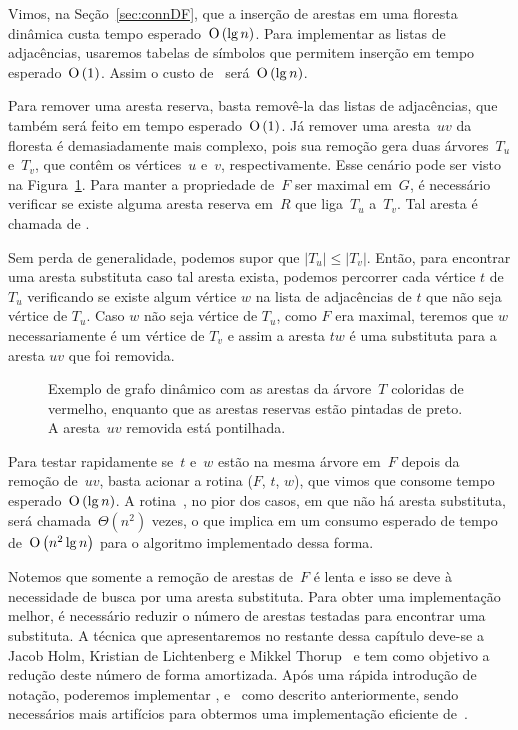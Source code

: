  Vimos, na Seção~\ref{sec:connDF}, que a inserção de arestas em uma floresta dinâmica custa tempo esperado~$\text{O}\left(\lg n\right)$. Para implementar as listas de adjacências, usaremos tabelas de símbolos que permitem inserção em tempo esperado~$\text{O}\left(1\right)$. Assim o custo de~\dymGraphAddEdge{} será~$\text{O}\left(\lg n\right)$.

Para remover uma aresta reserva, basta removê-la das listas de adjacências, que também será feito em tempo esperado~$\text{O}\left(1\right)$. Já remover uma aresta~$uv$ da floresta é demasiadamente mais complexo, pois sua remoção gera duas árvores~$T_u$ e~$T_v$, que contêm os vértices~$u$ e~$v$, respectivamente. Esse cenário pode ser visto na Figura~\ref{fig:DG-exemploTu-Tv}. Para manter a propriedade de~$F$ ser maximal em~$G$, é necessário verificar se existe alguma aresta reserva em~$R$ que liga~$T_u$ a~$T_v$. Tal aresta é chamada de .

Sem perda de generalidade, podemos supor que $|T_u|\leqslant |T_v|$. Então, para encontrar uma aresta substituta caso tal aresta exista, podemos percorrer cada vértice $t$ de $T_u$ verificando se existe algum vértice $w$ na lista de adjacências de $t$ que não seja vértice de $T_u$. Caso $w$ não seja vértice de $T_u$, como $F$ era maximal, teremos que $w$ necessariamente é um vértice de $T_v$ e assim a aresta $tw$ é uma substituta para a aresta $uv$ que foi removida.

\begin{figure}[htb]
\centering
\caption{Exemplo de grafo dinâmico com as arestas da árvore~$T$ coloridas de vermelho, enquanto que as arestas reservas estão pintadas de preto. A aresta~$uv$ removida está pontilhada.}
\label{fig:DG-exemploTu-Tv}
\end{figure}

Para testar rapidamente se~$t$ e~$w$ estão na mesma árvore em~$F$ depois da remoção de~$uv$, basta acionar a rotina \dymForestQuery($F$, $t$, $w$), que vimos que consome tempo esperado~$\text{O}\left(\lg n\right)$. A rotina~\dymForestQuery{}, no pior dos casos, em que não há aresta substituta, será chamada~$\Theta(n^2)$ vezes, o que implica em um consumo esperado de tempo de~$\text{O}\left(n^2\lg n\right)$ para o algoritmo implementado dessa forma.

Notemos que somente a remoção de arestas de~$F$ é lenta e isso se deve à necessidade de busca por uma aresta substituta. Para obter uma implementação melhor, é necessário reduzir o número de arestas testadas para encontrar uma substituta. A técnica que apresentaremos no restante dessa capítulo deve-se a Jacob Holm, Kristian de Lichtenberg e Mikkel Thorup~\cite{poly_log} e tem como objetivo a redução deste número de forma amortizada. Após uma rápida introdução de notação, poderemos implementar \dymGraphCreate{}, \dymGraphAddEdge{} e~\dymGraphQuery{} como descrito anteriormente, sendo necessários mais artifícios para obtermos uma implementação eficiente de~\dymGraphDelEdge{}.


